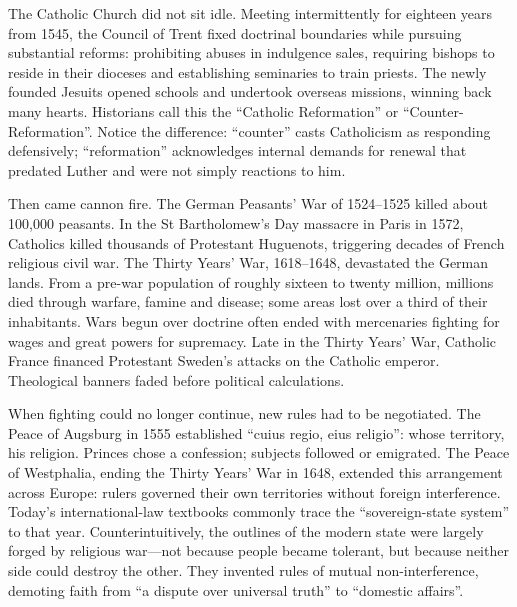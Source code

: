 The Catholic Church did not sit idle. Meeting intermittently for eighteen years from 1545, the Council of Trent fixed doctrinal boundaries while pursuing substantial reforms: prohibiting abuses in indulgence sales, requiring bishops to reside in their dioceses and establishing seminaries to train priests. The newly founded Jesuits opened schools and undertook overseas missions, winning back many hearts. Historians call this the ``Catholic Reformation'' or ``Counter-Reformation''. Notice the difference: ``counter'' casts Catholicism as responding defensively; ``reformation'' acknowledges internal demands for renewal that predated Luther and were not simply reactions to him.

Then came cannon fire. The German Peasants' War of 1524--1525 killed about 100,000 peasants. In the St Bartholomew's Day massacre in Paris in 1572, Catholics killed thousands of Protestant Huguenots, triggering decades of French religious civil war. The Thirty Years' War, 1618--1648, devastated the German lands. From a pre-war population of roughly sixteen to twenty million, millions died through warfare, famine and disease; some areas lost over a third of their inhabitants. Wars begun over doctrine often ended with mercenaries fighting for wages and great powers for supremacy. Late in the Thirty Years' War, Catholic France financed Protestant Sweden's attacks on the Catholic emperor. Theological banners faded before political calculations.

When fighting could no longer continue, new rules had to be negotiated. The Peace of Augsburg in 1555 established ``cuius regio, eius religio'': whose territory, his religion. Princes chose a confession; subjects followed or emigrated. The Peace of Westphalia, ending the Thirty Years' War in 1648, extended this arrangement across Europe: rulers governed their own territories without foreign interference. Today's international-law textbooks commonly trace the ``sovereign-state system'' to that year. Counterintuitively, the outlines of the modern state were largely forged by religious war---not because people became tolerant, but because neither side could destroy the other. They invented rules of mutual non-interference, demoting faith from ``a dispute over universal truth'' to ``domestic affairs''.

